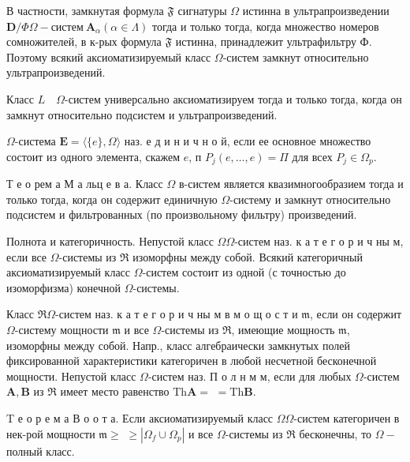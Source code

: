\documentclass[10pt]{article}
\begin{document}
В частности, замкнутая формула $\mathfrak{F}$ сигнатуры $\Omega$ истинна в ультрапроизведении $\boldsymbol{D} / \Phi \Omega-с и с т е м ~ \boldsymbol{A}_{\alpha}(\alpha \in \Lambda)$ тогда и только тогда, когда множество номеров сомножителей, в к-рых формула $\mathfrak{F}$ истинна, принадлежит ультрафильтру Ф. Поэтому всякий аксиоматизируемый класс $\Omega$-систем замкнут относительно ультрапроизведений.



Класс $L \quad \Omega$-систем универсально аксиоматизируем тогда и только тогда, когда он замкнут относительно подсистем и ультрапроизведений.



$\Omega$-система $\boldsymbol{E}=\langle\{e\}, \Omega\rangle$ наз. е д и н и ч н о й, если ее основное множество состоит из одного элемента, скажем $e$, п $P_{j}(e, \ldots, e)=\Pi$ для всех $P_{j} \in \Omega_{p}$.



Т е о рем а М а льц е в а. Класс $\Omega$ в-систем является квазимногообразием тогда и только тогда, когда он содержит единичную $\Omega$-систему и замкнут относительно подсистем и фильтрованных (по произвольному фильтру) произведений.



Полнота и категоричность. Непустой класс $\Omega \Omega$-систем наз. к а т е г о р и ч ны м, если все $\Omega$-системы из $\Re$ изоморфны между собой. Всякий категоричный аксиоматизируемый класс $\Omega$-систем состоит из одной (с точностью до изоморфизма) конечной $\Omega$-системы.



Класс $\Re \Omega$-систем наз. к а т е г о р и ч ны м в м о щ о с т и $\mathfrak{m}$, если он содержит $\Omega$-систему мощности $\mathfrak{m}$ и все $\Omega$-системы из $\mathfrak{\Re}$, имеющие мощность $\mathfrak{m}$, изоморфны между собой. Напр., класс алгебраически замкнутых полей фиксированной характеристики категоричен в любой несчетной бесконечной мощности. Непустой класс $\Omega$-систем наз. П о л н м м, если для любых $\Omega$-систем $\boldsymbol{A}, \boldsymbol{B}$ из $\Re$ имеет место равенство $\mathrm{Th} \boldsymbol{A}=$ $=\mathrm{Th} \boldsymbol{B}$.



T е о р е м а В о о т а. Если аксиоматизируемый класс $\mathfrak{\Omega} \Omega$-систем категоричен в нек-рой мощности $\mathfrak{m} \geqslant$ $\geqslant\left|\Omega_{f} \cup \Omega_{p}\right|$ и все $\Omega$-системы из $\Re$ бесконечны, то $\Omega-$ полный класс.
\end{document}
